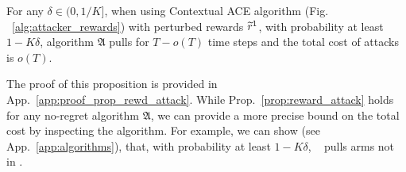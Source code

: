 \begin{prop}\label{prop:reward_attack}
	For any $\delta\in(0, 1/K]$, when using Contextual ACE algorithm (Fig. ~\ref{alg:attacker_rewards}) with perturbed rewards $\widetilde{r}^{1}$, with probability at least $1-K\delta$, algorithm $\mathfrak{A}$ pulls  for $T - o(T)$ time steps and the total cost of attacks is $o(T)$.
\end{prop}
The proof of this proposition is provided in App.~\ref{app:proof_prop_rewd_attack}. 
While Prop.~\ref{prop:reward_attack} holds for any no-regret algorithm $\mathfrak{A}$, we can provide a more precise bound on the total cost by inspecting the algorithm.
For example, we can show (see App.~\ref{app:algorithms}), that, with probability at least $1-K\delta$,  \linucb~\cite{abbasi2011improved} pulls arms not in  . 
